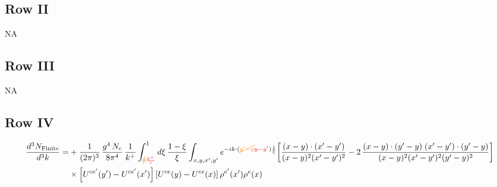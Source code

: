\documentclass[9pt]{article}
\numberwithin{equation}{section}
\begin{document}
\subsection{Row II}
\textsc{NA}
\subsection{Row III}
\textsc{NA}
\subsection{Row IV}
\begin{align}
\frac{d^{3}N_{\rm Finite}}{d^{3}k}= &  +\frac{1}{(2\pi)^{3}}\,\frac{g^{4}\,N_{c}}{8\pi^{4}}\,\frac{1}{k^{+}}\int_{{\color{orange}\cancel{0}}{\color{red}\frac{k^{+}}{\vee}}}^{1}d\xi\,\frac{1-\xi}{\xi}\int_{x,y,x',y'}e^{-ik\cdot({\color{orange}\cancel{y'-y}}{\color{red}y-y'})\frac{1}{\xi}}\bigg[\frac{(x-y)\cdot(x'-y')}{(x-y)^{2}(x'-y')^{2}}-2\,\frac{(x-y)\cdot(y'-y)\;(x'-y')\cdot(y'-y)}{(x-y)^{2}(x'-y')^{2}(y'-y)^{2}}\bigg]\notag\\
&\times\left[U^{ce'}(y') - U^{ce'}(x')\right]\left[U^{ce}(y) - U^{ce}(x)\right]\rho^{e'}(x')\rho^{e}(x)

\end{align}
\end{document}
